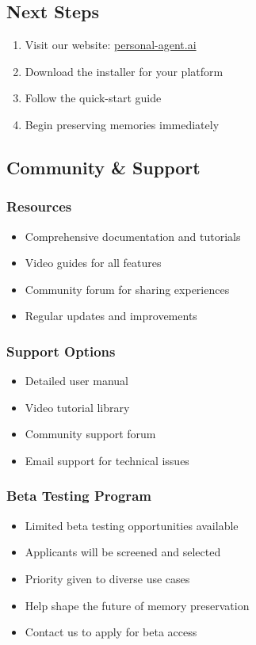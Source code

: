 \documentclass[11pt,letterpaper]{article}
\begin{document}
\subsection{Next Steps}
\begin{enumerate}
    \item Visit our website: \url{personal-agent.ai}
    \item Download the installer for your platform
    \item Follow the quick-start guide
    \item Begin preserving memories immediately
\end{enumerate}

\subsection{Community \& Support}

\subsubsection{Resources}
\begin{itemize}[leftmargin=*]
    \item Comprehensive documentation and tutorials
    \item Video guides for all features
    \item Community forum for sharing experiences
    \item Regular updates and improvements
\end{itemize}

\subsubsection{Support Options}
\begin{itemize}[leftmargin=*]
    \item Detailed user manual
    \item Video tutorial library
    \item Community support forum
    \item Email support for technical issues
\end{itemize}

\subsubsection{Beta Testing Program}
\begin{itemize}[leftmargin=*]
    \item Limited beta testing opportunities available
    \item Applicants will be screened and selected
    \item Priority given to diverse use cases
    \item Help shape the future of memory preservation
    \item Contact us to apply for beta access
\end{itemize}
\end{document}
